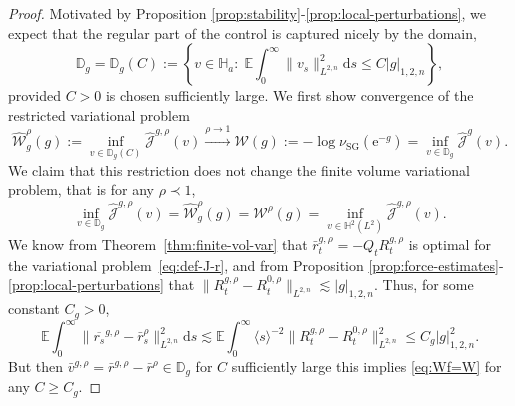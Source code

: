 \documentclass[11pt, a4paper]{scrartcl}
\numberwithin{equation}{section}
\theoremstyle{plain}
\theoremstyle{remark}
\newcommand{\assign}{:=}
\newcommand{\mathd}{\mathrm{d}}
\newcommand{\mathe}{\mathrm{e}}
\newcommand{\tmop}[1]{\ensuremath{\operatorname{#1}}}
\newcommand{\tmtextit}[1]{\text{{\itshape{#1}}}}
\begin{document}
\begin{proof}
  \tmtextit{Restriction to $\mathbb{D}_g$:} Motivated by Proposition
  \ref{prop:stability}-\ref{prop:local-perturbations}, we expect that the
  regular part of the control is captured nicely by the domain,
  \begin{equation}
    \mathbb{D}_g =\mathbb{D}_g (C) \assign \left\{ v \in \mathbb{H}_a : \;
    \mathbb{E} \int_0^{\infty} \| v_s \|^2_{L^{2, n}} \mathd s \leqslant C | g
    |_{1, 2, n} \right\}, \label{eq:Df-r}
  \end{equation}
  provided $C > 0$ is chosen sufficiently large. We first show convergence of
  the restricted variational problem
  \[ \widehat{\mathcal{W}}_g^{\rho} (g) \assign \inf_{v \in \mathbb{D}_g (C)} 
     \hat{\mathcal{J}}^{g, \rho} (v) \overset{\rho \rightarrow
     1}{\longrightarrow} \mathcal{W} (g) \assign - \log \nu_{\tmop{SG}}
     (\mathe^{- g}) = \inf_{v \in \mathbb{D}_g}  \hat{\mathcal{J}}^g (v) . \]
  We claim that this restriction does not change the finite volume variational
  problem, that is for any $\rho \prec 1$,
  \begin{equation}
    \inf_{v \in \mathbb{D}_g}  \hat{\mathcal{J}}^{g, \rho} (v) =
    \widehat{\mathcal{W}}_g^{\rho} (g) = \mathcal{W}^{\rho} (g) = \inf_{v \in
    \mathbb{H}^2 (L^2)}  \hat{\mathcal{J}}^{g, \rho} (v) . \label{eq:Wf=W}
  \end{equation}
  We know from Theorem~\ref{thm:finite-vol-var} that $\bar{r}^{g, \rho}_t =
  - Q_t R_t^{g, \rho}$ is optimal for the variational
  problem~\eqref{eq:def-J-r}, and from Proposition
  \ref{prop:force-estimates}-\ref{prop:local-perturbations} that $\| R_t^{g,
  \rho} - R_t^{0, \rho} \|_{L^{2, n}} \lesssim | g |_{1, 2, n}$. Thus, for
  some constant $C_g > 0$,
  \[ \mathbb{E} \int_0^{\infty} \| \overline{r_s}^{g, \rho} - \bar{r}_s^{\rho}
     \|_{L^{2, n}}^2 \mathd s \lesssim \mathbb{E} \int_0^{\infty} \langle s
     \rangle^{- 2} \| R_t^{g, \rho} - R_t^{0, \rho} \|^2_{L^{2, n}} \leqslant
     C_g | g |_{1, 2, n}^2 . \]
  But then $\bar{v}^{g, \rho} = \bar{r}^{g, \rho} - \bar{r}^{\rho} \in
  \mathbb{D}_g$ for $C$ sufficiently large this implies \eqref{eq:Wf=W} for
  any $C \geqslant C_g$.
  

\end{proof}
\end{document}
